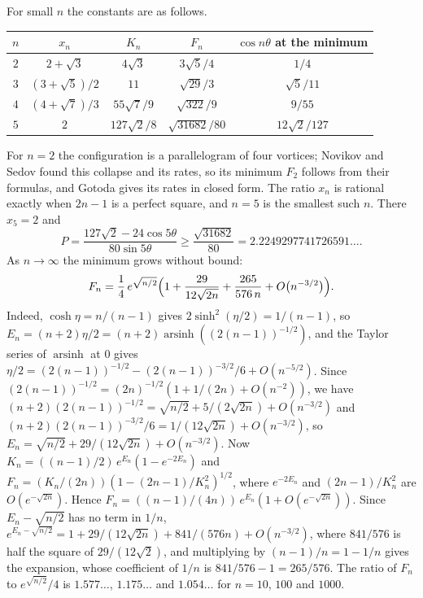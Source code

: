 \documentclass[11pt]{article}
\theoremstyle{definition}
\begin{document}
For small $n$ the constants are as follows.
\begin{center}
\renewcommand{\arraystretch}{1.35}
\begin{tabular}{|c|c|c|c|c|}
  \hline
  $n$ & $x_n$ & $K_n$ & $F_n$ & $\cos n\theta$ at the minimum \\ \hline
  $2$ & $2 + \sqrt{3}$ & $4\sqrt{3}$ & $3\sqrt{5}/4$ & $1/4$ \\ \hline
  $3$ & $(3 + \sqrt{5})/2$ & $11$ & $\sqrt{29}/3$ & $\sqrt{5}/11$ \\ \hline
  $4$ & $(4 + \sqrt{7})/3$ & $55\sqrt{7}/9$ & $\sqrt{322}/9$ & $9/55$ \\ \hline
  $5$ & $2$ & $127\sqrt{2}/8$ & $\sqrt{31682}/80$ & $12\sqrt{2}/127$ \\ \hline
\end{tabular}
\end{center}
For $n = 2$ the configuration is a parallelogram of four vortices; Novikov and Sedov \cite[Sect.~4]{ns1979} found this collapse and its rates, so its minimum $F_2$ follows from their formulas, and Gotoda \cite{gotoda2021} gives its rates in closed form. The ratio $x_n$ is rational exactly when $2n - 1$ is a perfect square, and $n = 5$ is the smallest such $n$. There $x_5 = 2$ and
\[
  P = \frac{127\sqrt{2} - 24\cos 5\theta}{80\sin 5\theta} \ge \frac{\sqrt{31682}}{80} = 2.2249297741726591\ldots.
\]
As $n \to \infty$ the minimum grows without bound:
\[
  F_n = \frac14\, e^{\sqrt{n/2}}\Bigl(1 + \frac{29}{12\sqrt{2n}} + \frac{265}{576\,n} + O\bigl(n^{-3/2}\bigr)\Bigr).
\]
Indeed, $\cosh\eta = n/(n - 1)$ gives $2\sinh^2(\eta/2) = 1/(n - 1)$, so $E_n = (n + 2)\eta/2 = (n + 2)\operatorname{arsinh}((2(n - 1))^{-1/2})$, and the Taylor series of $\operatorname{arsinh}$ at $0$ gives $\eta/2 = (2(n - 1))^{-1/2} - (2(n - 1))^{-3/2}/6 + O(n^{-5/2})$. Since $(2(n - 1))^{-1/2} = (2n)^{-1/2}(1 + 1/(2n) + O(n^{-2}))$, we have $(n + 2)(2(n - 1))^{-1/2} = \sqrt{n/2} + 5/(2\sqrt{2n}) + O(n^{-3/2})$ and $(n + 2)(2(n - 1))^{-3/2}/6 = 1/(12\sqrt{2n}) + O(n^{-3/2})$, so $E_n = \sqrt{n/2} + 29/(12\sqrt{2n}) + O(n^{-3/2})$. Now $K_n = ((n - 1)/2)\,e^{E_n}(1 - e^{-2E_n})$ and $F_n = (K_n/(2n))(1 - (2n - 1)/K_n^2)^{1/2}$, where $e^{-2E_n}$ and $(2n - 1)/K_n^2$ are $O(e^{-\sqrt{2n}})$. Hence $F_n = ((n - 1)/(4n))\,e^{E_n}(1 + O(e^{-\sqrt{2n}}))$. Since $E_n - \sqrt{n/2}$ has no term in $1/n$, $e^{E_n - \sqrt{n/2}} = 1 + 29/(12\sqrt{2n}) + 841/(576n) + O(n^{-3/2})$, where $841/576$ is half the square of $29/(12\sqrt{2})$, and multiplying by $(n - 1)/n = 1 - 1/n$ gives the expansion, whose coefficient of $1/n$ is $841/576 - 1 = 265/576$. The ratio of $F_n$ to $e^{\sqrt{n/2}}/4$ is $1.577\ldots$, $1.175\ldots$ and $1.054\ldots$ for $n = 10$, $100$ and $1000$.
\end{document}

